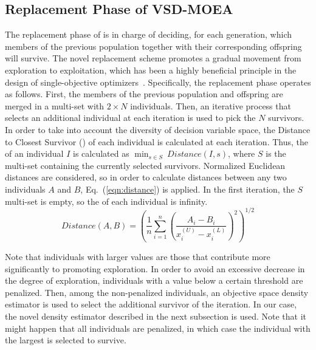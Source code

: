 \subsection{Replacement Phase of VSD-MOEA}

The replacement phase of \EAS{} is in charge of deciding, for each generation, which members of the previous population together with their corresponding offspring will survive.
%
The novel replacement scheme promotes a gradual movement from exploration to exploitation, which has been a highly 
beneficial principle in the design of single-objective optimizers~\citep{Joel:MULTI_DYNAMIC}.
%
Specifically, the replacement phase operates as follows.
%
First, the members of the previous population and offspring are merged in a multi-set with $2 \times N$ individuals.
%
Then, an iterative process that selects an additional
individual at each iteration is used to pick the $N$ survivors. 
%
In order to take into account the diversity of decision variable space, the Distance to Closest Survivor (\DCS{}) of each
individual is calculated at each iteration.
%
Thus, the \DCS{} of an individual $I$ is calculated as $\displaystyle{\min_{s \in S}\ Distance(I, s)}$,
where $S$ is the multi-set containing the currently selected survivors. 
%
Normalized Euclidean distances are considered, so in order to calculate distances between any two individuals $A$ and $B$, 
Eq.~(\ref{eqn:distance}) is applied.
%
In the first iteration, the $S$ multi-set is empty, so the \DCS{} of each individual is infinity.
%
\begin{equation}\label{eqn:distance}
Distance(A, B) =   \left ( \frac{1}{n}  \sum_{i=1}^n \left ( \frac{A_i - B_i}{x_i^{(U)} - x_i^{(L)}} \right )^2  \right)^{1/2}
\end{equation}

Note that individuals with larger \DCS{} values are those that contribute more significantly to promoting exploration.
%
In order to avoid an excessive decrease in the degree of exploration, individuals with a \DCS{} value below a certain threshold are penalized.
%
Then, among the non-penalized individuals, an objective space density estimator is used to select the additional
survivor of the iteration.
%
In our case, the novel density estimator described in the next subsection is used. 
%
Note that it might happen that all individuals are penalized, in which case the individual with the largest \DCS{} is selected to survive.



